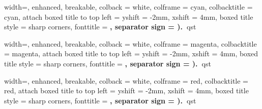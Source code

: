 
%
  {width=\linewidth, enhanced, breakable,
    colback = white, colframe = cyan, colbacktitle = cyan,
    attach boxed title to top left = {yshift = -2mm, xshift = 4mm},
    boxed title style = {sharp corners},
    fonttitle = \sffamily\bfseries, separator sign = {).~}}{qst}

%
  {width=\linewidth, enhanced, breakable,
    colback = white, colframe = magenta, colbacktitle = magenta,
    attach boxed title to top left = {yshift = -2mm, xshift = 4mm},
    boxed title style = {sharp corners},
    fonttitle = \sffamily\bfseries, separator sign = {).~}}{qst}
    
%
  {width=\linewidth, enhanced, breakable,
    colback = white, colframe = red, colbacktitle = red,
    attach boxed title to top left = {yshift = -2mm, xshift = 4mm},
    boxed title style = {sharp corners},
    fonttitle = \sffamily\bfseries, separator sign = {).~}}{qst}